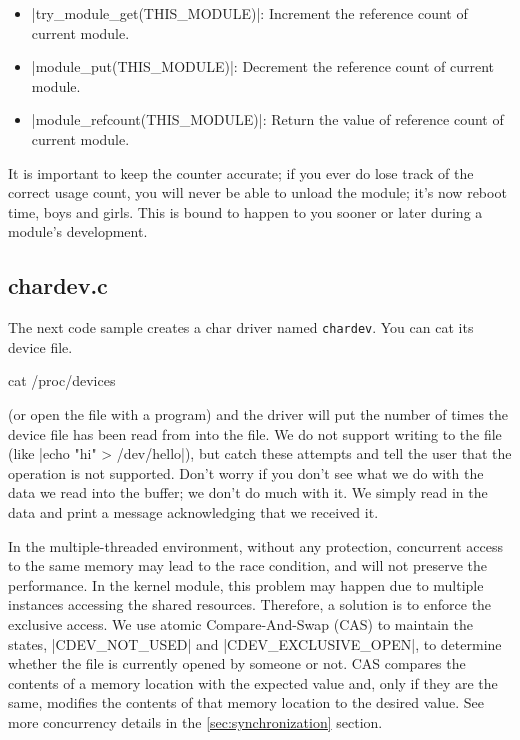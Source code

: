 \documentclass[10pt, oneside]{book}
\begin{document}
\begin{itemize}
  \item \cpp|try_module_get(THIS_MODULE)|: Increment the reference count of current module.
  \item \cpp|module_put(THIS_MODULE)|: Decrement the reference count of current module.
  \item \cpp|module_refcount(THIS_MODULE)|: Return the value of reference count of current module.
\end{itemize}

It is important to keep the counter accurate; if you ever do lose track of the correct usage count, you will never be able to unload the module; it's now reboot time, boys and girls.
This is bound to happen to you sooner or later during a module's development.

\subsection{chardev.c}
\label{sec:chardev_c}
The next code sample creates a char driver named \verb|chardev|.
You can cat its device file.

\begin{codebash}
cat /proc/devices
\end{codebash}

(or open the file with a program) and the driver will put the number of times the device file has been read from into the file.
We do not support writing to the file (like \sh|echo "hi" > /dev/hello|), but catch these attempts and tell the user that the operation is not supported.
Don't worry if you don't see what we do with the data we read into the buffer; we don't do much with it.
We simply read in the data and print a message acknowledging that we received it.

In the multiple-threaded environment, without any protection, concurrent access to the same memory may lead to the race condition, and will not preserve the performance.
In the kernel module, this problem may happen due to multiple instances accessing the shared resources.
Therefore, a solution is to enforce the exclusive access.
We use atomic Compare-And-Swap (CAS) to maintain the states, \cpp|CDEV_NOT_USED| and \cpp|CDEV_EXCLUSIVE_OPEN|, to determine whether the file is currently opened by someone or not.
CAS compares the contents of a memory location with the expected value and, only if they are the same, modifies the contents of that memory location to the desired value.
See more concurrency details in the \ref{sec:synchronization} section.
\end{document}
